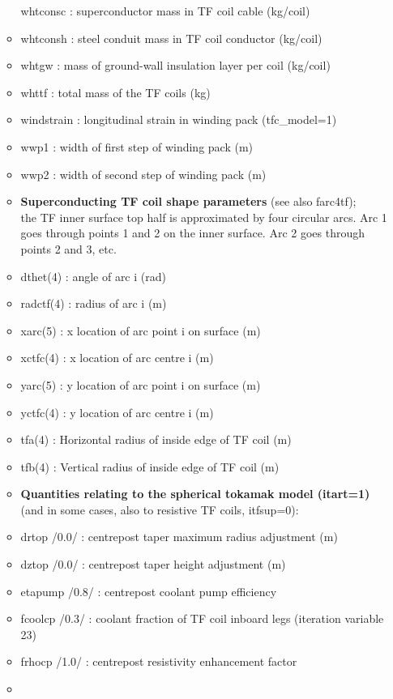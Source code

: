 \documentclass[
]{article}
\begin{document}
\begin{itemize}
\begin{itemize}
    whtconsc : superconductor mass in TF coil cable (kg/coil)
  \item
    whtconsh : steel conduit mass in TF coil conductor (kg/coil)
  \item
    whtgw : mass of ground-wall insulation layer per coil (kg/coil)
  \item
    whttf : total mass of the TF coils (kg)
  \item
    windstrain : longitudinal strain in winding pack (tfc\_model=1)
  \item
    wwp1 : width of first step of winding pack (m)
  \item
    wwp2 : width of second step of winding pack (m)
  \item
    \textbf{Superconducting TF coil shape parameters} (see also
    farc4tf);\\
    the TF inner surface top half is approximated by four circular arcs.
    Arc 1 goes through points 1 and 2 on the inner surface. Arc 2 goes
    through points 2 and 3, etc.
  \item
    dthet(4) : angle of arc i (rad)
  \item
    radctf(4) : radius of arc i (m)
  \item
    xarc(5) : x location of arc point i on surface (m)
  \item
    xctfc(4) : x location of arc centre i (m)
  \item
    yarc(5) : y location of arc point i on surface (m)
  \item
    yctfc(4) : y location of arc centre i (m)
  \item
    tfa(4) : Horizontal radius of inside edge of TF coil (m)
  \item
    tfb(4) : Vertical radius of inside edge of TF coil (m)
  \item
    \textbf{Quantities relating to the spherical tokamak model
    (itart=1)} (and in some cases, also to resistive TF coils,
    itfsup=0):
  \item
    drtop /0.0/ : centrepost taper maximum radius adjustment (m)
  \item
    dztop /0.0/ : centrepost taper height adjustment (m)
  \item
    etapump /0.8/ : centrepost coolant pump efficiency
  \item
    fcoolcp /0.3/ : coolant fraction of TF coil inboard legs (iteration
    variable 23)
  \item
    frhocp /1.0/ : centrepost resistivity enhancement factor
  \item

\end{itemize}
\end{itemize}
\end{document}
